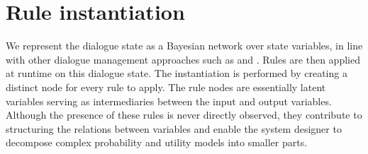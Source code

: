 

\section{Rule instantiation}
\label{sec:ruleinstantiation}

We represent the dialogue state as a Bayesian network over state variables, in line with other dialogue management approaches such as \cite{Thomson:2010:BUD:1772996.1773040} and \cite{bui2009}. Rules are then applied at runtime on this dialogue state.  The instantiation is performed by creating a distinct node for every rule to apply. The rule nodes are essentially latent variables serving as intermediaries between the input and output variables.  Although the presence of these rules is never directly observed, they contribute to structuring the relations between variables and enable the system designer to decompose complex probability and utility models into smaller parts.   %

